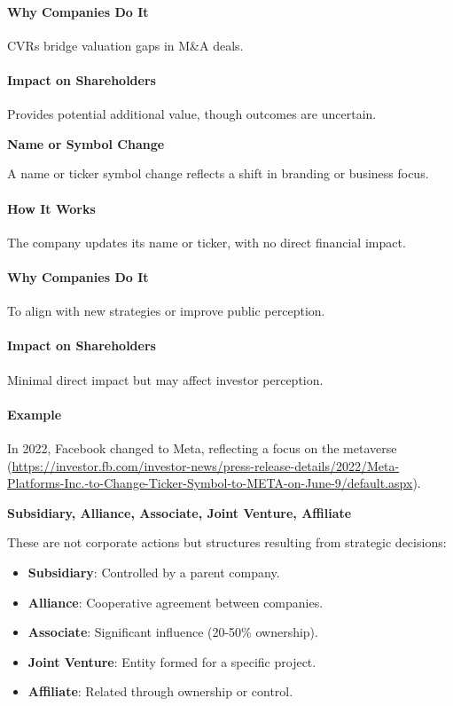 \documentclass[12pt]{article}
\begin{document}
\paragraph{Why Companies Do It}
CVRs bridge valuation gaps in M\&A deals.

\paragraph{Impact on Shareholders}
Provides potential additional value, though outcomes are uncertain.

\textbf{Name or Symbol Change}

A name or ticker symbol change reflects a shift in branding or business focus.

\paragraph{How It Works}
The company updates its name or ticker, with no direct financial impact.

\paragraph{Why Companies Do It}
To align with new strategies or improve public perception.

\paragraph{Impact on Shareholders}
Minimal direct impact but may affect investor perception.

\paragraph{Example}
In 2022, Facebook changed to Meta, reflecting a focus on the metaverse (\url{https://investor.fb.com/investor-news/press-release-details/2022/Meta-Platforms-Inc.-to-Change-Ticker-Symbol-to-META-on-June-9/default.aspx}).

\textbf{Subsidiary, Alliance, Associate, Joint Venture, Affiliate}

These are not corporate actions but structures resulting from strategic decisions:

\begin{itemize}
    \item \textbf{Subsidiary}: Controlled by a parent company.
    \item \textbf{Alliance}: Cooperative agreement between companies.
    \item \textbf{Associate}: Significant influence (20-50\% ownership).
    \item \textbf{Joint Venture}: Entity formed for a specific project.
    \item \textbf{Affiliate}: Related through ownership or control.
\end{itemize}
\end{document}
